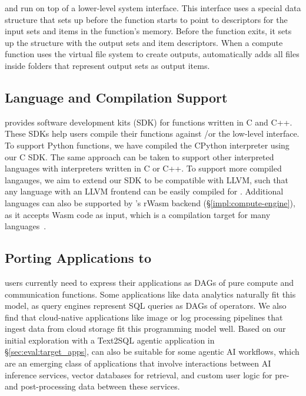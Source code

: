 \dlibc and \dlibcpp run on top of a lower-level system interface.
This interface uses a special data structure that \dandelion sets up before the function starts to point to descriptors for the input sets and items in the function's memory. Before the function exits, it sets up the structure with the output sets and item descriptors. When a compute function uses the virtual file system to create outputs, \dlibc automatically adds all files inside folders that represent output sets as output items. 

\subsection{Language and Compilation Support}\label{sec:prog:sdk}
\dandelion provides software development kits (SDK) for functions written in C and C++.
These SDKs help users compile their functions against \dlibc /\dlibcpp or the low-level interface.
To support Python functions, we have compiled the CPython interpreter using our C SDK.
The same approach can be taken to support other interpreted languages with interpreters written in C or C++.
To support more compiled langauges, we aim to extend our SDK to be compatible with LLVM, such that any language with an LLVM frontend can be easily compiled for \dandelion.
Additional languages can also be supported by \dandelion's rWasm backend (\S\ref{impl:compute-engine}), as it accepts Wasm code as input, which is a compilation target for many languages~\cite{emscripten}. 

\subsection{Porting Applications to \dandelion}\label{sec:prog:porting}

\dandelion users currently need to express their applications as DAGs of pure compute and communication functions.
Some applications like data analytics naturally fit this model, as query engines represent SQL queries as DAGs of operators. We also find that cloud-native applications like image or log processing pipelines that ingest data from cloud storage fit this programming model well. Based on our initial exploration with a Text2SQL agentic application in \S\ref{sec:eval:target_apps}, \dandelion can also be suitable for some agentic AI workflows, which are an emerging class of applications that involve interactions between AI inference services, vector databases for retrieval, and custom user logic for pre- and post-processing data between these services. 

